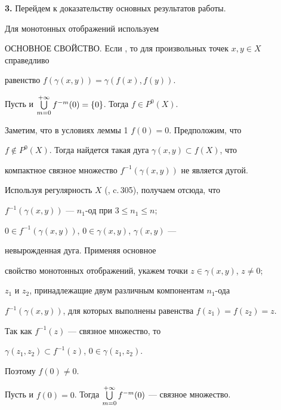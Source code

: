 {\bf 3.} Перейдем к доказательству основных результатов работы.


Для монотонных отображений используем


\medskip





ОСНОВНОЕ СВОЙСТВО. Если \fm{}, то для произвольных точек $x,y\in X$ справедливо


равенство $f(\gamma (x,y))=\gamma (f(x),f(y))$.





\begin{lem} Пусть \fm{} и $\bigcup\limits_{m=0}^{+\infty}f^{-m}(0) =\{0\}$. Тогда $f\in P^0(X)$.


\end{lem}





\begin{pf} Заметим, что в условиях леммы 1 $f(0)=0$. Предположим, что


$f\notin P^0(X)$. Тогда найдется такая дуга $\gamma (x,y)\subset f(X)$, что


компактное связное множество $f^{-1}(\gamma (x,y))$ не является дугой.


Используя регулярность $X$ (\cite{Kur}, c.\,305), получаем отсюда, что


$f^{-1}(\gamma (x,y))$ --- $n_1$-од при $3\le n_1\le n$;


$0\in f^{-1}(\gamma (x,y))$, $0\in \gamma (x,y)$, $\gamma (x,y)$ ---


невырожденная дуга. Применяя основное


свойство монотонных отображений, укажем точки $z\in \gamma (x,y)$, $z\ne 0$;


$z_1$ и $z_2$, принадлежащие двум различным компонентам $n_1$-ода


$f^{-1}(\gamma (x,y))$, для которых выполнены равенства $f(z_1)=f(z_2)=z$.


Так как $f^{-1}(z)$ --- связное множество, то


$\gamma (z_1,z_2)\subset f^{-1}(z)$, $0\in \gamma (z_1,z_2)$.


Поэтому $f(0)\ne 0$.


\end{pf}





\begin{lem} Пусть \fm{} и $f(0)=0$. Тогда $\bigcup\limits_{m=0}^{+\infty}f^{-m}(0) $ --- связное множество.


\end{lem}





